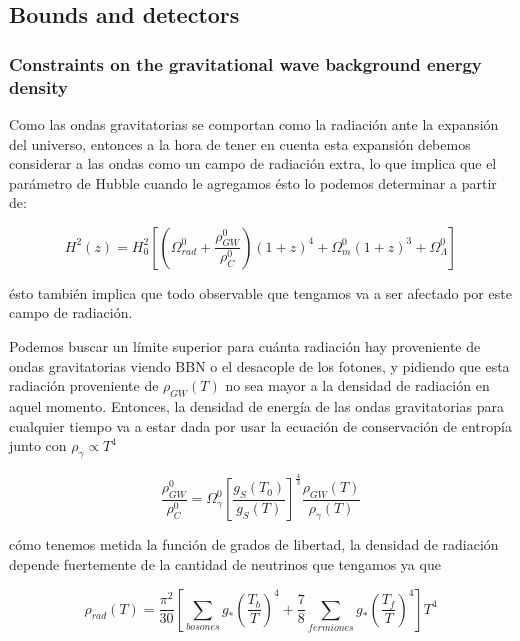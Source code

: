 \subsection{Bounds and detectors}

\subsubsection{Constraints on the gravitational wave background energy density}

Como las ondas gravitatorias se comportan como la radiación ante la expansión del universo, entonces a la hora de tener en cuenta esta expansión debemos considerar a las ondas como un campo de radiación extra, lo que implica que el parámetro de Hubble cuando le agregamos ésto lo podemos determinar a partir de:

\begin{equation}
    H^2 (z) = H_0^2 \left[ \left(\Omega^0_{rad} + \frac{\rho_{GW}^0}{\rho^0_{C}} \right) (1 + z)^4 + \Omega_m^0 (1 + z)^3 + \Omega_\Lambda^0 \right]
\end{equation}

\noindent
ésto también implica que todo observable que tengamos va a ser afectado por este campo de radiación.

Podemos buscar un límite superior para cuánta radiación hay proveniente de ondas gravitatorias viendo BBN o el desacople de los fotones, y pidiendo que esta radiación proveniente de $\rho_{GW} (T)$ no sea mayor a la densidad de radiación en aquel momento. Entonces, la densidad de energía de las ondas gravitatorias para cualquier tiempo va a estar dada por usar la ecuación de conservación de entropía junto con $\rho_\gamma \propto T^4$

\begin{equation}
    \frac{\rho_{GW}^0}{\rho_C^0} = \Omega^0_\gamma \left[ \frac{g_S (T_0)}{g_S (T)} \right]^{\displaystyle \frac{4}{3}} \frac{\rho_{GW}(T)}{\rho_{\gamma} (T)}
\end{equation}

\noindent
cómo tenemos metida la función de grados de libertad, la densidad de radiación depende fuertemente de la cantidad de neutrinos que tengamos ya que

\begin{equation}
    \rho_{rad} (T) = \frac{\pi^2}{30} \left[ \sum_{bosones} g_{*} \left( \frac{T_b}{T} \right)^4 + \frac{7}{8} \sum_{fermiones} g_* \left( \frac{T_f}{T} \right)^4 \right] T^4
\end{equation}

